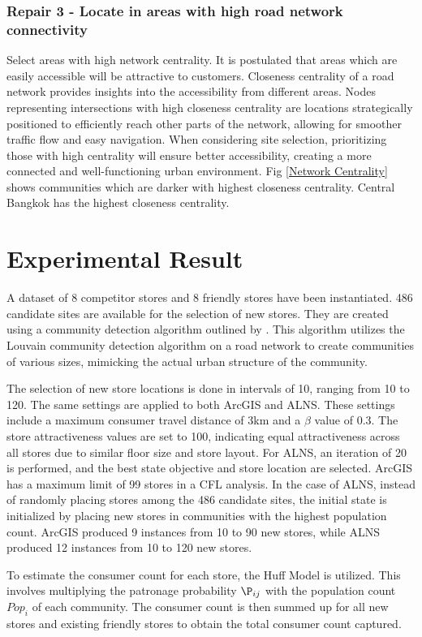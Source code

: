 \documentclass{ecai}
\begin{document}
\subsubsection{Repair 3 - Locate in areas with high road network connectivity}
Select areas with high network centrality. It is postulated that areas which are easily accessible will be attractive to customers. Closeness centrality of a road network provides insights into the accessibility from different areas. Nodes representing intersections with high closeness centrality are locations strategically positioned to efficiently reach other parts of the network, allowing for smoother traffic flow and easy navigation. When considering site selection, prioritizing those with high centrality will ensure better accessibility, creating a more connected and well-functioning urban environment. Fig \ref{Network Centrality} shows communities which are darker with highest closeness centrality. Central Bangkok has the highest closeness centrality.

\section{Experimental Result}
A dataset of 8 competitor stores and 8 friendly stores have been instantiated. 486 candidate sites are available for the selection of new stores. They are created using a community detection algorithm outlined by \citep{tan2022data, tan2023big}. This algorithm utilizes the Louvain community detection algorithm on a road network to create communities of various sizes, mimicking the actual urban structure of the community.

The selection of new store locations is done in intervals of 10, ranging from 10 to 120. The same settings are applied to both ArcGIS and ALNS. These settings include a maximum consumer travel distance of 3km and a $\beta$ value of 0.3. The store attractiveness values are set to 100, indicating equal attractiveness across all stores due to similar floor size and store layout. For ALNS, an iteration of 20 is performed, and the best state objective and store location are selected. ArcGIS has a maximum limit of 99 stores in a CFL analysis. In the case of ALNS, instead of randomly placing stores among the 486 candidate sites, the initial state is initialized by placing new stores in communities with the highest population count. ArcGIS produced 9 instances from 10 to 90 new stores, while ALNS produced 12 instances from 10 to 120 new stores.

To estimate the consumer count for each store, the Huff Model is utilized. This involves multiplying the patronage probability $\P_{ij}$ with the population count $Pop_i$ of each community. The consumer count is then summed up for all new stores and existing friendly stores to obtain the total consumer count captured. 
\end{document}
